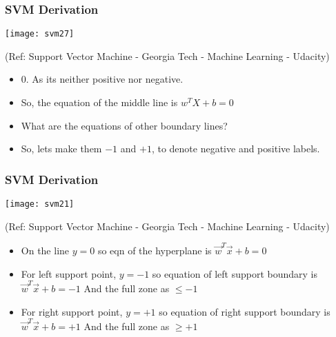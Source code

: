 \begin{frame}[fragile] \frametitle{SVM Derivation}
\begin{center}
\texttt{[image: svm27]}

\tiny{(Ref: Support Vector Machine - Georgia Tech - Machine Learning - Udacity)}
\end{center}

\begin{itemize}
\item 0. As its neither positive nor negative.
\item  So, the equation of the middle line is $w^TX + b = 0$
\item What are the equations of other boundary lines?
\item So, lets make them $-1$ and $+1$, to denote negative and positive labels.
\end{itemize}
\end{frame}


\begin{frame}[fragile] \frametitle{SVM Derivation}
\begin{center}
\texttt{[image: svm21]}

\tiny{(Ref: Support Vector Machine - Georgia Tech - Machine Learning - Udacity)}
\end{center}

\begin{itemize}
\item On the line $y=0$ so eqn of the hyperplane is  $\overrightarrow{w}^T \overrightarrow{x}+ b = 0$
\item For left support point, $y=-1$ so equation of left support boundary is  $\overrightarrow{w}^T \overrightarrow{x}+ b = -1$ And the full zone as $\leq -1$
\item For right support point, $y=+1$ so equation of right support boundary is  $\overrightarrow{w}^T \overrightarrow{x}+ b = +1$ And the full zone as $\geq +1$
\end{itemize}
\end{frame}

